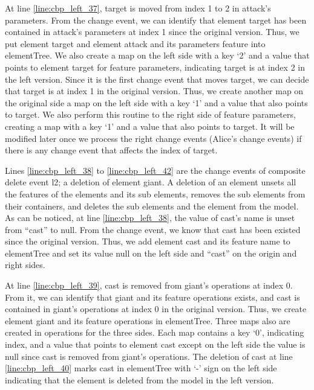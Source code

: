 At line \ref{line:cbp_left_37}, \textsf{target} is moved from index 1 to 2 in \textsf{attack}'s \textsf{parameters}. From the change event, we can identify that element \textsf{target} has been contained in \textsf{attack}'s \textsf{parameters} at index 1 since the original version. Thus, we put element \textsf{target} and element \textsf{attack} and its \textsf{parameters} feature into \textsf{elementTree}. We also create a map on the left side with a key `2' and a value that points to element \textsf{target} for feature \textsf{parameters}, indicating \textsf{target} is at index 2 in the left version. Since it is the first change event that moves \textsf{target}, we can decide that \textsf{target} is at index 1 in the original version. Thus, we create another map on the original side a map on the left side with a key `1' and a value that also points to \textsf{target}. We also perform this routine to the right side of feature \textsf{parameters}, creating a map with a key `1' and a value that also points to \textsf{target}. It will be modified later once we process the right change events (Alice's change events) if there is any change event that affects the index of \textsf{target}.

Lines \ref{line:cbp_left_38} to \ref{line:cbp_left_42} are the change events of  composite delete event \textsf{l2}; a deletion of element \textsf{giant}. 
A deletion of an element unsets all the features of the elements and its sub elements, removes the sub elements from their containers, and deletes the sub elements and the element from the model. 
As can be noticed,  at line \ref{line:cbp_left_38}, the value of \textsf{cast}'s \textsf{name}  is unset from ``cast'' to null. From the change event, we know that cast has been existed since the original version. Thus, we add element \textsf{cast} and its feature \textsf{name} to \textsf{elementTree} and set its value null on the left side and ``cast'' on the origin and right sides. 

At line \ref{line:cbp_left_39}, \textsf{cast} is removed from \textsf{giant}'s \textsf{operations} at index 0. From it, we can identify that \textsf{giant} and its feature \textsf{operations} exists, and \textsf{cast} is contained in \textsf{giant}'s \textsf{operations} at index 0 in the original version. Thus, we create element \textsf{giant} and its feature \textsf{operations} in \textsf{elementTree}. Three maps also are created in \textsf{operations} for the three sides. Each map contains a key `0', indicating index, and a value that points to element \textsf{cast} except on the left side the value is null since \textsf{cast} is removed from \textsf{giant}'s \textsf{operations}. The deletion of \textsf{cast} at line \ref{line:cbp_left_40} marks \textsf{cast} in \textsf{elementTree} with `-' sign on the left side indicating that the element is deleted from the model in the left version.

